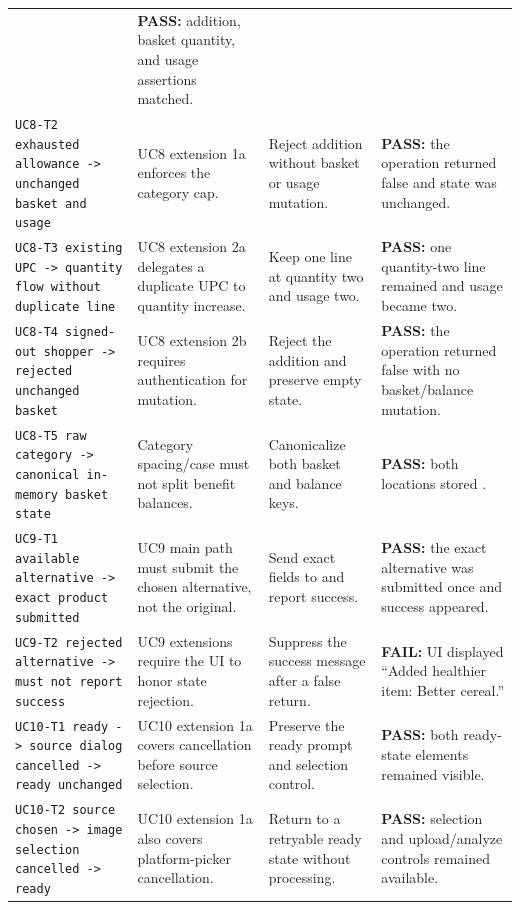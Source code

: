 \documentclass[sigconf]{acmart}
\begin{document}
\begin{table}[!p]
\begin{tabular}{@{}L{0.26\textwidth}L{0.21\textwidth}L{0.20\textwidth}L{0.27\textwidth}@{}}
      & \textbf{PASS:} addition, basket quantity, and usage assertions matched. \\
    \texttt{UC8-T2 exhausted allowance -> unchanged basket and usage}
      & UC8 extension 1a enforces the category cap.
      & Reject addition without basket or usage mutation.
      & \textbf{PASS:} the operation returned false and state was unchanged. \\
    \texttt{UC8-T3 existing UPC -> quantity flow without duplicate line}
      & UC8 extension 2a delegates a duplicate UPC to quantity increase.
      & Keep one line at quantity two and usage two.
      & \textbf{PASS:} one quantity-two line remained and usage became two. \\
    \texttt{UC8-T4 signed-out shopper -> rejected unchanged basket}
      & UC8 extension 2b requires authentication for mutation.
      & Reject the addition and preserve empty state.
      & \textbf{PASS:} the operation returned false with no basket/balance mutation. \\
    \texttt{UC8-T5 raw category -> canonical in-memory basket state}
      & Category spacing/case must not split benefit balances.
      & Canonicalize both basket and balance keys.
      & \textbf{PASS:} both locations stored . \\
    \texttt{UC9-T1 available alternative -> exact product submitted}
      & UC9 main path must submit the chosen alternative, not the original.
      & Send exact fields to  and report success.
      & \textbf{PASS:} the exact alternative was submitted once and success appeared. \\
    \texttt{UC9-T2 rejected alternative -> must not report success}
      & UC9 extensions require the UI to honor state rejection.
      & Suppress the success message after a false return.
      & \textbf{FAIL:} UI displayed ``Added healthier item: Better cereal.'' \\
    \texttt{UC10-T1 ready -> source dialog cancelled -> ready unchanged}
      & UC10 extension 1a covers cancellation before source selection.
      & Preserve the ready prompt and selection control.
      & \textbf{PASS:} both ready-state elements remained visible. \\
    \texttt{UC10-T2 source chosen -> image selection cancelled -> ready}
      & UC10 extension 1a also covers platform-picker cancellation.
      & Return to a retryable ready state without processing.
      & \textbf{PASS:} selection and upload/analyze controls remained available. \\

\end{tabular}
\end{table}
\end{document}
